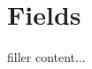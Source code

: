 \documentclass[../../templates/section]{subfiles}
\begin{document}
\section{Fields}\label{sec:fields}

filler content...
\end{document}
